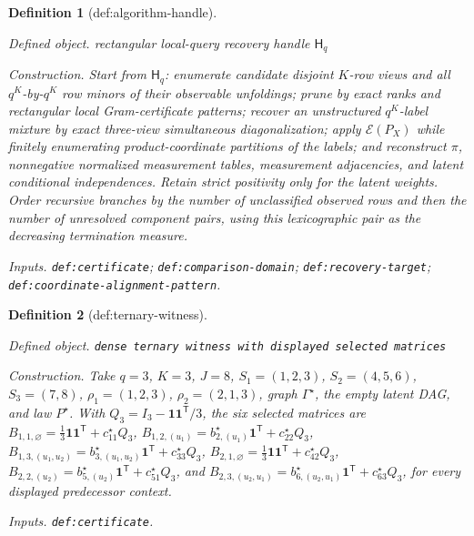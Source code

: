 \documentclass{article}
\newtheorem{definition}{Definition}
\begin{document}
\begin{definition}[def:algorithm-handle]\label{def:algorithm-handle}
\par\smallskip\noindent\emph{Defined object.} rectangular local-query recovery handle \(\mathsf H_q\)
\par\smallskip\noindent\emph{Construction.} Start from \(\mathsf H_q\): enumerate candidate disjoint \(K\)-row views and all \(q^K\)-by-\(q^K\) row minors of their observable unfoldings; prune by exact ranks and rectangular local Gram-certificate patterns; recover an unstructured \(q^K\)-label mixture by exact three-view simultaneous diagonalization; apply \(\mathcal E(P_X)\) while finitely enumerating product-coordinate partitions of the labels; and reconstruct \(\pi\), nonnegative normalized measurement tables, measurement adjacencies, and latent conditional independences.  Retain strict positivity only for the latent weights.  Order recursive branches by the number of unclassified observed rows and then the number of unresolved component pairs, using this lexicographic pair as the decreasing termination measure.
\par\smallskip\noindent\emph{Inputs.} \texttt{def:\allowbreak{}certificate}; \texttt{def:\allowbreak{}comparison-\allowbreak{}domain}; \texttt{def:\allowbreak{}recovery-\allowbreak{}target}; \texttt{def:\allowbreak{}coordinate-\allowbreak{}alignment-\allowbreak{}pattern}.
\end{definition}

\begin{definition}[def:ternary-witness]\label{def:ternary-witness}
\par\smallskip\noindent\emph{Defined object.} \texttt{dense ternary witness with displayed selected matrices}
\par\smallskip\noindent\emph{Construction.} Take \(q=3\), \(K=3\), \(J=8\), \(S_1=(1,2,3)\), \(S_2=(4,5,6)\), \(S_3=(7,8)\), \(\rho_1=(1,2,3)\), \(\rho_2=(2,1,3)\), graph \(\Gamma^{\star}\), the empty latent DAG, and law \(P^{\star}\). With \(Q_3=I_3-\mathbf1\mathbf1^{\mathsf T}/3\), the six selected matrices are \(B_{1,1,\varnothing}=\frac13\mathbf1\mathbf1^{\mathsf T}+c^{\star}_{11}Q_3\), \(B_{1,2,(u_1)}=b^{\star}_{2,(u_1)}\mathbf1^{\mathsf T}+c^{\star}_{22}Q_3\), \(B_{1,3,(u_1,u_2)}=b^{\star}_{3,(u_1,u_2)}\mathbf1^{\mathsf T}+c^{\star}_{33}Q_3\), \(B_{2,1,\varnothing}=\frac13\mathbf1\mathbf1^{\mathsf T}+c^{\star}_{42}Q_3\), \(B_{2,2,(u_2)}=b^{\star}_{5,(u_2)}\mathbf1^{\mathsf T}+c^{\star}_{51}Q_3\), and \(B_{2,3,(u_2,u_1)}=b^{\star}_{6,(u_2,u_1)}\mathbf1^{\mathsf T}+c^{\star}_{63}Q_3\), for every displayed predecessor context.
\par\smallskip\noindent\emph{Inputs.} \texttt{def:\allowbreak{}certificate}.
\end{definition}
\end{document}
